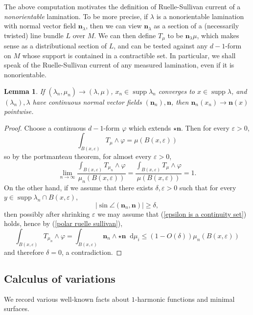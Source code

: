 \documentclass[reqno,11pt]{amsart}
\newcommand*\dif{\mathop{}\!\mathrm{d}}
\DeclareMathOperator{\supp}{supp}
\newcommand{\normal}{\mathbf n}
\newtheorem{lemma}[theorem]{Lemma}
\theoremstyle{definition}
\numberwithin{equation}{section}
\begin{document}
The above computation motivates the definition of Ruelle-Sullivan current of a \emph{nonorientable} lamination.
To be more precise, if $\lambda$ is a nonorientable lamination with normal vector field $\normal_\lambda$, then we can view $\normal_\lambda$ as a section of a (necessarily twisted) line bundle $L$ over $M$.
We can then define $T_\mu$ to be $\normal_\lambda \mu$, which makes sense as a distributional section of $L$, and can be tested against any $d-1$-form on $M$ whose support is contained in a contractible set.
In particular, we shall speak of the Ruelle-Sullivan current of any measured lamination, even if it is nonorientable.

\begin{lemma}\label{convergence of normals}
If $(\lambda_n, \mu_n) \to (\lambda, \mu)$, $x_n \in \supp \lambda_n$ converges to $x \in \supp \lambda$, and $(\lambda_n), \lambda$ have continuous normal vector fields $(\normal_n), \normal$, then $\normal_n(x_n) \to \normal(x)$ pointwise.
\end{lemma}
\begin{proof}
	Choose a continuous $d-1$-form $\varphi$ which extends $\star \normal$.
	Then for every $\varepsilon > 0$,
	$$\int_{B(x, \varepsilon)} T_\mu \wedge \varphi = \mu(B(x, \varepsilon))$$
	so by the portmanteau theorem, for almost every $\varepsilon > 0$,
	\begin{equation}\label{epsilon is a continuity set}
		\lim_{n \to \infty} \frac{\int_{B(x, \varepsilon)} T_{\mu_n} \wedge \varphi}{\mu_n(B(x, \varepsilon))} = \frac{\int_{B(x, \varepsilon)} T_\mu \wedge \varphi}{\mu(B(x, \varepsilon))} = 1.
	\end{equation}
	On the other hand, if we assume that there exists $\delta, \varepsilon > 0$ such that for every $y \in \supp \lambda_n \cap B(x, \varepsilon)$,
	$$|\sin \angle(\normal_n, \normal)| \geq \delta,$$
	then possibly after shrinking $\varepsilon$ we may assume that (\ref{epsilon is a continuity set}) holds, hence by (\ref{polar ruelle sullivan}),
	$$\int_{B(x, \varepsilon)} T_{\mu_n} \wedge \varphi = \int_{B(x, \varepsilon)} \normal_n \wedge \star \normal \dif \mu_i \leq (1 - O(\delta)) \mu_n(B(x, \varepsilon))$$
	and therefore $\delta = 0$, a contradiction.
\end{proof}


\subsection{Calculus of variations}
We record various well-known facts about $1$-harmonic functions and minimal surfaces.
\end{document}
